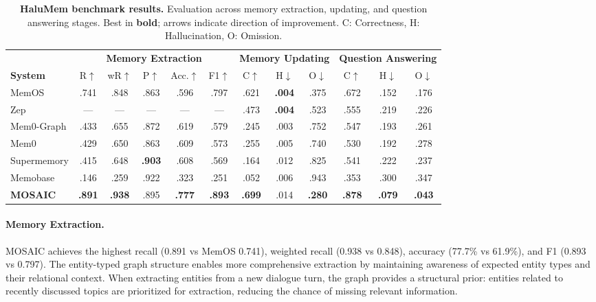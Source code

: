 \documentclass[10pt,twocolumn]{article}
\begin{document}
\begin{table}[!t]
\centering
\caption{\textbf{HaluMem benchmark results.} Evaluation across memory
extraction, updating, and question answering stages. Best in \textbf{bold};
arrows indicate direction of improvement. C: Correctness, H: Hallucination,
O: Omission.}
\label{tab:halumem}
\small
\setlength{\tabcolsep}{4pt}
\begin{tabular}{@{}l cc cc c ccc ccc@{}}
\toprule
& \multicolumn{5}{c}{\textbf{Memory Extraction}} &
  \multicolumn{3}{c}{\textbf{Memory Updating}} &
  \multicolumn{3}{c}{\textbf{Question Answering}} \\
\cmidrule(lr){2-6}\cmidrule(lr){7-9}\cmidrule(lr){10-12}
\textbf{System} & R$\uparrow$ & wR$\uparrow$ & P$\uparrow$
  & Acc.$\uparrow$ & F1$\uparrow$
  & C$\uparrow$ & H$\downarrow$ & O$\downarrow$
  & C$\uparrow$ & H$\downarrow$ & O$\downarrow$ \\
\midrule
MemOS & .741 & .848 & .863 & .596 & .797
  & .621 & \textbf{.004} & .375 & .672 & .152 & .176 \\
Zep & --- & --- & --- & --- & ---
  & .473 & \textbf{.004} & .523 & .555 & .219 & .226 \\
Mem0-Graph & .433 & .655 & .872 & .619 & .579
  & .245 & .003 & .752 & .547 & .193 & .261 \\
Mem0 & .429 & .650 & .863 & .609 & .573
  & .255 & .005 & .740 & .530 & .192 & .278 \\
Supermemory & .415 & .648 & \textbf{.903} & .608 & .569
  & .164 & .012 & .825 & .541 & .222 & .237 \\
Memobase & .146 & .259 & .922 & .323 & .251
  & .052 & .006 & .943 & .353 & .300 & .347 \\
\midrule
\textbf{MOSAIC} & \textbf{.891} & \textbf{.938} & .895 & \textbf{.777} & \textbf{.893}
  & \textbf{.699} & .014 & \textbf{.280} & \textbf{.878} & \textbf{.079} & \textbf{.043} \\
\bottomrule
\end{tabular}
\end{table}

\paragraph{Memory Extraction.}
MOSAIC achieves the highest recall (0.891 vs MemOS 0.741), weighted recall
(0.938 vs 0.848), accuracy (77.7\% vs 61.9\%), and F1 (0.893 vs 0.797).
The entity-typed graph structure enables more comprehensive extraction by
maintaining awareness of expected entity types and their relational context.
When extracting entities from a new dialogue turn, the graph provides a
structural prior: entities related to recently discussed topics are
prioritized for extraction, reducing the chance of missing relevant
information.
\end{document}
